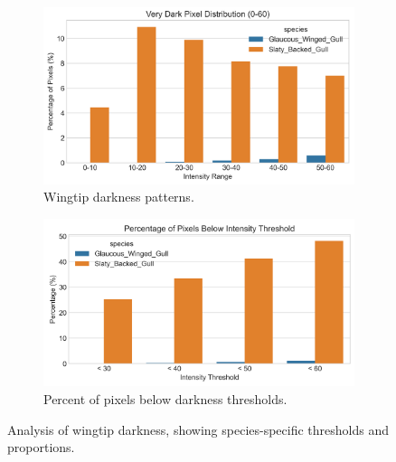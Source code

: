\documentclass[a4paper,12pt]{report}
\begin{document}
\begin{figure}[H]
    \centering
    \begin{subfigure}[b]{0.48\textwidth}
        \centering
        \includegraphics[width=\textwidth]{images/REPORT_IMAGES_INTENSITY/I2/verydarkdist.png}
        \caption{Wingtip darkness patterns.}
        \label{fig:wingtip_darkness}
    \end{subfigure}
    \hfill
    \begin{subfigure}[b]{0.48\textwidth}
        \centering
        \includegraphics[width=\textwidth]{images/REPORT_IMAGES_INTENSITY/I2/pixelsbelowthresh.png}
        \caption{Percent of pixels below darkness thresholds.}
        \label{fig:pixels_below_thresh}
    \end{subfigure}
    \caption{Analysis of wingtip darkness, showing species-specific thresholds and proportions.}
    \label{fig:wingtip_darkness_combined}
\end{figure}
\end{document}
